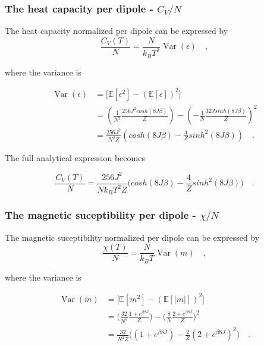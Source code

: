 \documentclass[../main_proj4_correct_template.tex]{subfiles}
\begin{document}
\subsubsection{The heat capacity per dipole - $C_V/N$}\label{app:p4a_Cv}

The heat capacity normalized per dipole can be expressed by 
\begin{equation*}
    \frac{C_V(T)}{N} = \frac{N}{k_BT^{2}} \operatorname{Var}(\epsilon) \quad, 
\end{equation*}

\noindent where the variance is 

\begin{equation*}
\begin{split}
    \operatorname{Var}(\epsilon) &= \Big[ \mathbb{E}[\epsilon^{2}] - (\mathbb{E}[\epsilon])^{2}\Big] \\
    &= \left(\frac{1}{N^{2}}\frac{256 J^{2} cosh(8J\beta)}{Z}\right)- \left(- \frac{1}{N}\frac{32Jsinh(8J\beta)}{Z}\right)^{2} \\
    &= \frac{256J^{2}}{N^{2}Z} \left( cosh(8J\beta) - \frac{4}{Z}sinh^{2}(8J\beta) \right) \quad. 
\end{split}
\end{equation*}

\noindent The full analytical expression becomes 

\begin{equation*}
    \frac{C_V(T)}{N} = \frac{256J^{2}}{Nk_BT^{2} Z} \bigg( cosh(8J\beta) - \frac{4}{Z}sinh^{2}(8J\beta) \bigg) \quad.
\end{equation*}

\subsubsection{The magnetic suceptibility per dipole - $\chi/N$}\label{app:p4a_chi}

The  magnetic suceptibility normalized per dipole can be expressed by 
\begin{equation*}
    \frac{\chi(T)}{N} = \frac{N}{k_BT} \operatorname{Var}(m) \quad, 
\end{equation*}

\noindent where the variance is 

\begin{equation*}
\begin{split}
    \operatorname{Var}(m) &= \Big[ \mathbb{E}[m^{2}] - (\mathbb{E}[|m|])^{2}\Big] \\
    &= \bigg(\frac{32}{N^{2}} \frac{1 +e^{\beta8J}}{Z}\bigg) - \bigg(\frac{8}{N}\frac{2+e^{\beta8J}}{Z}\bigg)^{2} \\
    &= \frac{32}{N^{2}Z} \bigg((1+e^{\beta8J}) - \frac{2}{Z}(2+e^{\beta8J})^{2}\bigg)\quad. 
\end{split}
\end{equation*}
\end{document}
